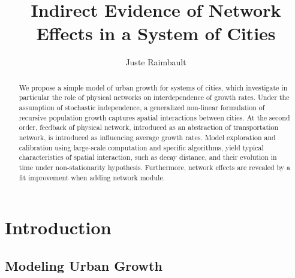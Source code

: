 \documentclass[Royal,sageh,times]{sagej}
\begin{document}

\title{Indirect Evidence of Network Effects in a System of Cities}

\author{Juste Raimbault}




\begin{abstract}
We propose a simple model of urban growth for systems of cities, which investigate in particular the role of physical networks on interdependence of growth rates. Under the assumption of stochastic independence, a generalized non-linear formulation of recursive population growth captures spatial interactions between cities. At the second order, feedback of physical network, introduced as an abstraction of transportation network, is introduced as influencing average growth rates. Model exploration and calibration using large-scale computation and specific algorithms, yield typical characteristics of spatial interaction, such as decay distance, and their evolution in time under non-stationarity hypothesis. Furthermore, network effects are revealed by a fit improvement when adding network module.
\end{abstract}


\maketitle






\section*{Introduction}

\subsection*{Modeling Urban Growth}
\end{document}
